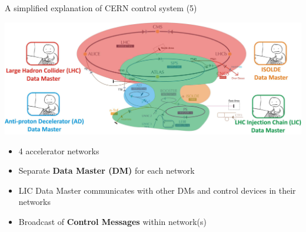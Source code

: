 \documentclass[compress,red]{beamer}
\begin{document}
\begin{frame}{A simplified explanation of CERN control system (5)}

      \begin{center}
      \includegraphics[width=.7\textwidth]{applications/CERN/accNetworks.pdf}
      \end{center}

  \begin{itemize}
    \item 4 accelerator networks
    \item Separate {\bf Data Master (DM)} for each network
    \item \textcolor{green!90}{LIC Data Master} communicates with other DMs and control devices in their networks
    \item Broadcast of {\bf Control Messages} within network(s)
  \end{itemize}

\end{frame}
\end{document}
